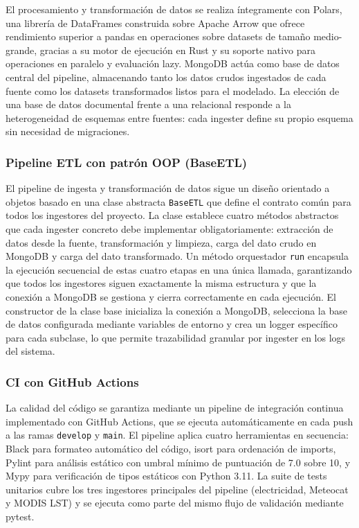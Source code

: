 \documentclass[12pt, a4paper]{article}
\begin{document}
El procesamiento y transformación de datos se realiza íntegramente con Polars, una librería de DataFrames construida sobre Apache Arrow que ofrece rendimiento superior a pandas en operaciones sobre datasets de tamaño medio-grande, gracias a su motor de ejecución en Rust y su soporte nativo para operaciones en paralelo y evaluación lazy. MongoDB actúa como base de datos central del pipeline, almacenando tanto los datos crudos ingestados de cada fuente como los datasets transformados listos para el modelado. La elección de una base de datos documental frente a una relacional responde a la heterogeneidad de esquemas entre fuentes: cada ingester define su propio esquema sin necesidad de migraciones.

\subsubsection{Pipeline ETL con patrón OOP (BaseETL)}


El pipeline de ingesta y transformación de datos sigue un diseño orientado a objetos basado en una clase abstracta \texttt{BaseETL} que define el contrato común para todos los ingestores del proyecto. La clase establece cuatro métodos abstractos que cada ingester concreto debe implementar obligatoriamente: extracción de datos desde la fuente, transformación y limpieza, carga del dato crudo en MongoDB y carga del dato transformado. Un método orquestador \texttt{run} encapsula la ejecución secuencial de estas cuatro etapas en una única llamada, garantizando que todos los ingestores siguen exactamente la misma estructura y que la conexión a MongoDB se gestiona y cierra correctamente en cada ejecución. El constructor de la clase base inicializa la conexión a MongoDB, selecciona la base de datos configurada mediante variables de entorno y crea un logger específico para cada subclase, lo que permite trazabilidad granular por ingester en los logs del sistema.

\subsubsection{CI con GitHub Actions}


La calidad del código se garantiza mediante un pipeline de integración continua implementado con GitHub Actions, que se ejecuta automáticamente en cada push a las ramas \texttt{develop} y \texttt{main}. El pipeline aplica cuatro herramientas en secuencia: Black para formateo automático del código, isort para ordenación de imports, Pylint para análisis estático con umbral mínimo de puntuación de 7.0 sobre 10, y Mypy para verificación de tipos estáticos con Python 3.11. La suite de tests unitarios cubre los tres ingestores principales del pipeline (electricidad, Meteocat y MODIS LST) y se ejecuta como parte del mismo flujo de validación mediante pytest.
\end{document}
